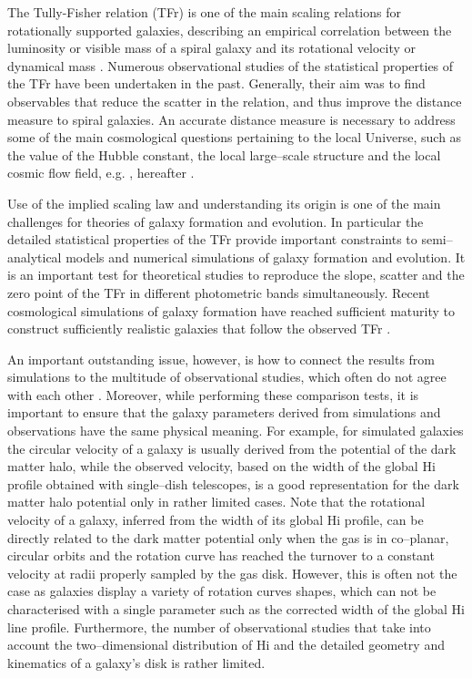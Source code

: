 \documentclass[usenatbib,useAMS]{mnras}
\begin{document}
The Tully-Fisher relation (TFr) is one of the main scaling relations for
rotationally supported galaxies, describing an empirical correlation
between the luminosity or visible mass of a spiral galaxy and its
rotational velocity or dynamical mass \citep{tf77}.  Numerous
observational studies of the statistical properties of the TFr have been
undertaken in the past.  Generally, their aim was to find observables
that reduce the scatter in the relation, and thus improve the distance
measure to spiral galaxies.  An accurate distance measure is necessary
to address some of the main cosmological questions pertaining to the
local Universe, such as the value of the Hubble constant, the local
large--scale structure and the local cosmic flow field, e.g. 
\citealt{TC12}, hereafter . 

Use of the implied scaling law and understanding its origin is one of
the main challenges for theories of galaxy formation and evolution.  In
particular the detailed statistical properties of the TFr provide
important constraints to semi--analytical models and numerical
simulations of galaxy formation and evolution.  It is an important test
for theoretical studies to reproduce the slope, scatter and the zero
point of the TFr in different photometric bands simultaneously.  Recent
cosmological simulations of galaxy formation have reached sufficient
maturity to construct sufficiently realistic galaxies that follow the
observed TFr \citep{mar14, vog14, schaye15}. 
  
An important outstanding issue, however, is how to connect the results
from simulations to the multitude of observational studies, which often
do not agree with each other \citep{mcg12, zar14}.  Moreover, while
performing these comparison tests, it is important to ensure that the
galaxy parameters derived from simulations and observations have the
same physical meaning.  For example, for simulated galaxies the circular
velocity of a galaxy is usually derived from the potential of the dark
matter halo, while the observed velocity, based on the width of the
global H{\sc i} profile obtained with single--dish telescopes, is a good
representation for the dark matter halo potential only in rather limited
cases.  Note that the rotational velocity of a galaxy, inferred from the
width of its global H{\sc i} profile, can be directly related to the
dark matter potential only when the gas is in co--planar, circular
orbits and the rotation curve has reached the turnover to a constant
velocity at radii properly sampled by the gas disk.  However, this is
often not the case as galaxies display a variety of rotation curves
shapes, which can not be characterised with a single parameter such as
the corrected width of the global H{\sc i} line profile.  Furthermore,
the number of observational studies that take into account the
two--dimensional distribution of H{\sc i} and the detailed geometry and
kinematics of a galaxy's disk is rather limited. 
\end{document}
